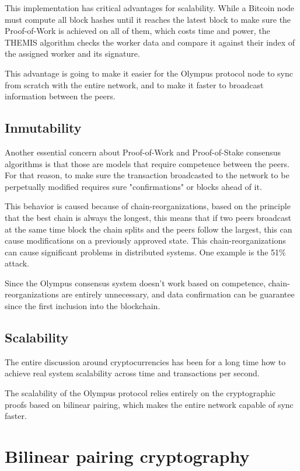 \documentclass{article}
\begin{document}
	This implementation has critical advantages for scalability. While a Bitcoin node must compute all block hashes until it reaches the latest block to make sure the Proof-of-Work is achieved on all of them, which costs time and power, the THEMIS algorithm checks the worker data and compare it against their index of the assigned worker and its signature. 
	
	This advantage is going to make it easier for the Olympus protocol node to sync from scratch with the entire network, and to make it faster to broadcast information between the peers.
	
	\subsection{Inmutability}
	
	Another essential concern about Proof-of-Work and Proof-of-Stake consensus algorithms is that those are models that require competence between the peers. For that reason, to make sure the transaction broadcasted to the network to be perpetually modified requires sure "confirmations" or blocks ahead of it. 
	
	This behavior is caused because of chain-reorganizations, based on the principle that the best chain is always the longest, this means that if two peers broadcast at the same time block the chain splits and the peers follow the largest, this can cause modifications on a previously approved state. This chain-reorganizations can cause significant problems in distributed systems. One example is the 51\% attack.
	
	Since the Olympus consensus system doesn't work based on competence, chain-reorganizations are entirely unnecessary, and data confirmation can be guarantee since the first inclusion into the blockchain. 
	
	\subsection{Scalability}				
	
	The entire discussion around cryptocurrencies has been for a long time how to achieve real system scalability across time and transactions per second. 
	
	The scalability of the Olympus protocol relies entirely on the cryptographic proofs based on bilinear pairing, which makes the entire network capable of sync faster.
											
	\section{Bilinear pairing cryptography}	
	
\end{document}
